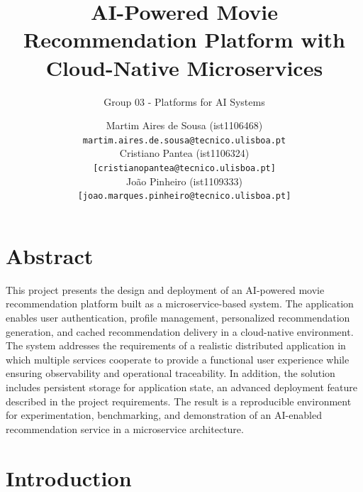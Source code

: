 \documentclass[10pt]{llncs}
\begin{document}
\title{AI-Powered Movie Recommendation Platform with Cloud-Native Microservices}

\subtitle{Group 03 - Platforms for AI Systems}

\author{
    \parbox{\textwidth}{
        \centering
        Martim Aires de Sousa (ist1106468)\\
        {\small \texttt{martim.aires.de.sousa@tecnico.ulisboa.pt}}\\[0.8em]
        Cristiano Pantea (ist1106324)\\
        {\small \texttt{[cristianopantea@tecnico.ulisboa.pt]}}\\[0.8em]
        João Pinheiro (ist1109333)\\
        {\small \texttt{[joao.marques.pinheiro@tecnico.ulisboa.pt]}}
    }
}




\section*{Abstract}
This project presents the design and deployment of an AI-powered movie recommendation platform built as a microservice-based system. The application enables user authentication, profile management, personalized recommendation generation, and cached recommendation delivery in a cloud-native environment. The system addresses the requirements of a realistic distributed application in which multiple services cooperate to provide a functional user experience while ensuring observability and operational traceability. In addition, the solution includes persistent storage for application state, an advanced deployment feature described in the project requirements. The result is a reproducible environment for experimentation, benchmarking, and demonstration of an AI-enabled recommendation service in a microservice architecture.


\section{Introduction}
\end{document}
